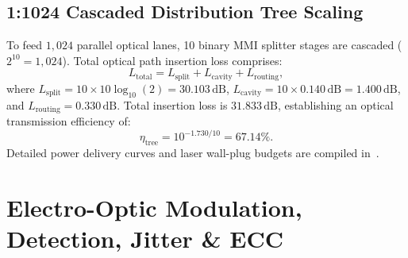 \documentclass[journal]{IEEEtran}
\begin{document}
\subsection{1:1024 Cascaded Distribution Tree Scaling}
To feed $1,024$ parallel optical lanes, 10 binary MMI splitter stages are cascaded ($2^{10} = 1,024$). Total optical path insertion loss comprises:
\begin{equation}
    L_{\text{total}} = L_{\text{split}} + L_{\text{cavity}} + L_{\text{routing}},
\end{equation}
where $L_{\text{split}} = 10 \times 10\log_{10}(2) = 30.103\,\text{dB}$, $L_{\text{cavity}} = 10 \times 0.140\,\text{dB} = 1.400\,\text{dB}$, and $L_{\text{routing}} = 0.330\,\text{dB}$. Total insertion loss is $31.833\,\text{dB}$, establishing an optical transmission efficiency of:
\begin{equation}
    \eta_{\text{tree}} = 10^{-1.730/10} = \mathbf{67.14\%}.
\end{equation}
Detailed power delivery curves and laser wall-plug budgets are compiled in~\cite{omi_sim_report}.

\section{Electro-Optic Modulation, Detection, Jitter \& ECC}
\label{sec:opto_electronics}
\end{document}
